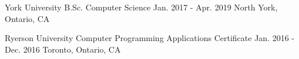 

\begin{cventries}

  \cventry
    {York University} %
    {B.Sc. Computer Science} %
    {Jan. 2017 - Apr. 2019} %
    {North York, Ontario, CA} %
    {
      \begin{cvitems} %
      \end{cvitems}
    }


  \cventry
  {Ryerson University} %
  {Computer Programming Applications Certificate} %
  {Jan. 2016 - Dec. 2016} %
  {Toronto, Ontario, CA} %
  {
    \begin{cvitems} %
    \end{cvitems}
  }

\end{cventries}